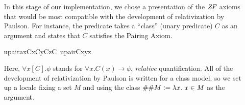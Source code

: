 In this stage of our implementation, we chose a presentation of the
$\mathit{ZF}$ axioms that would be most
compatible with the development of relativization by Paulson. For
instance, the predicate
takes a ``class'' (unary predicate) $C$ as an argument and states that
$C$ satisfies the Pairing Axiom.
\begin{isabelle}
upair{\isacharunderscore}ax{\isacharparenleft}C{\isacharparenright}{\isacharequal}{\isacharequal}{\isasymforall}x{\isacharbrackleft}C{\isacharbrackright}{\isachardot}{\isasymforall}y{\isacharbrackleft}C{\isacharbrackright}{\isachardot}{\isasymexists}z{\isacharbrackleft}C{\isacharbrackright}{\isachardot}\ upair{\isacharparenleft}C{\isacharcomma}x{\isacharcomma}y{\isacharcomma}z{\isacharparenright}
\end{isabelle}
Here, $\forall x[C]. \phi$ stands for
$\forall x. C(x) \longrightarrow \phi$, \emph{relative}
quantification. All of the development of relativization by Paulson is
written for a class model, so we set up a locale fixing a set $M$
and using the class $\#\#M\defi \lambda x. \ x\in M$ as the argument. 
